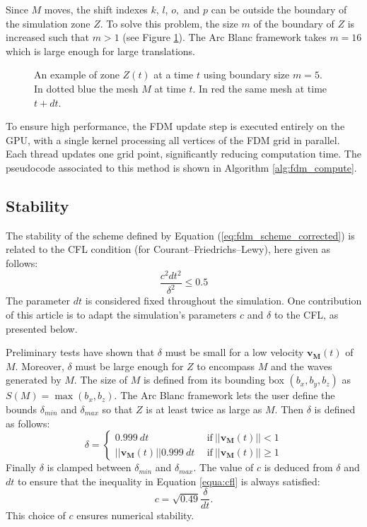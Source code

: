 \documentclass[11pt]{article}
\def\Framework{The Arc Blanc framework\xspace}
\begin{document}
Since $M$ moves, the shift indexes $k$, $l$, $o,$ and $p$ can be outside the boundary of the simulation zone $Z$.
To solve this problem, the size $m$ of the boundary of $Z$ is increased such that $m>1$ (see Figure \ref{fig:examGrid}).
\Framework takes $m=16$ which is large enough for large translations.

\begin{figure}[!h]
	\centering
	
	\caption{An example of zone $Z(t)$ at a time $t$ using boundary size $m=5$.
		In \textcolor{bleuF}{dotted blue} the mesh ${M}$ at time $t$.
		In \textcolor{redF}{red} the same mesh at time $t+dt$.}
	\label{fig:examGrid}
\end{figure}


To ensure high performance, the FDM update step is executed entirely on the GPU, with a single kernel processing all vertices of the FDM grid in parallel.
Each thread updates one grid point, significantly reducing computation time. The pseudocode associated to this method is shown in Algorithm \ref{alg:fdm_compute}.



\subsection{Stability}
\label{subsec:stability}
The stability of the scheme defined by Equation (\ref{eq:fdm_scheme_corrected}) is related to the CFL condition (for Courant–Friedrichs–Lewy), here given as follows:
\begin{equation}
	\label{equa:cfl}
	\frac{c^2dt^2}{\delta^2}\leq 0.5
\end{equation}
The parameter $dt$ is considered fixed throughout the simulation.
One contribution of this article is to adapt the simulation's parameters $c$ and $\delta$ to the CFL, as presented below.

Preliminary tests have shown that $\delta$ must be small for a low velocity $\mathbf{v_M}(t)$ of $M$.
Moreover, $\delta$ must be large enough for $Z$ to encompass $M$ and the waves generated by $M$.
The size of $M$ is defined from its bounding box $(b_x, b_y, b_z)$ as $S(M)=\max(b_x, b_z)$.
\Framework lets the user define the bounds $\delta_{min}$ and $\delta_{max}$ so that $Z$ is at least twice as large as $M$.
Then $\delta$ is defined as follows:
\begin{equation}
	\delta =
	\begin{cases}
		0.999~dt                    & ~~ \text{if}~||\mathbf{v_M}(t)||<1    \\
		||\mathbf{v_M}(t)||0.999~dt & ~~ \text{if}~||\mathbf{v_M}(t)||\geq1
	\end{cases}
\end{equation}
Finally $\delta$ is clamped between $\delta_{min}$ and $\delta_{max}$.
The value of $c$ is deduced from $\delta$ and $dt$ to ensure that the inequality in Equation \ref{equa:cfl} is always satisfied:
\begin{equation}
	c = \sqrt{0.49} \frac{\delta}{dt}.
\end{equation}
This choice of $c$ ensures numerical stability.
\end{document}
